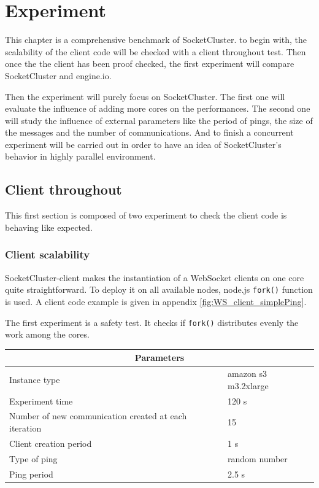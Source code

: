 \chapter{Experiment} 
\label{Chapter3} 

This chapter is a comprehensive benchmark of SocketCluster. to begin with, the
scalability of the client code will be checked with a client throughout test.
Then once the the client has been proof checked, the first experiment will
compare SocketCluster and engine.io. 

Then the experiment will purely focus on SocketCluster. The first one will
evaluate the influence of adding more cores on the performances. The second one
will study the influence of external parameters like the period of pings, the
size of the messages and the number of communications. And to finish a
concurrent experiment will be carried out in order to have an idea of
SocketCluster's behavior in highly parallel environment.  

\section{Client throughout}

This first section is composed of two experiment to check the client code is
behaving like expected.

\subsection{Client scalability}

SocketCluster-client makes the instantiation of a WebSocket clients on one core
quite straightforward. To deploy it on all available nodes, node.js
\texttt{fork()} function is used. A client code example is given in appendix
\ref{fig:WS_client_simplePing}.

The first experiment is a safety test. It checks if \texttt{fork()} distributes
evenly the work among the cores.

\begin{center}
  \begin{tabular}{ | l | l |}
  \hline
  \multicolumn{2}{|c|}{Parameters} \\
  \hline
    Instance type &  amazon s3 m3.2xlarge\\ 
    Experiment time & 120 s \\
    Number of new communication created at each iteration & 15 \\
    Client creation period & 1 s \\
    Type of ping & random number \\ 
    Ping period & 2.5 s \\ 
  \hline
  \end{tabular}
\end{center}

